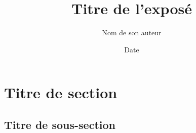 \documentclass{beamer}
\title{Titre de l'exposé}
\author{Nom de son auteur}
\date{Date}
\begin{document}
\frame{\titlepage}

\section{Titre de section}
\frame{\sectionpage}

\subsection{Titre de sous-section}
\frame{\subsectionpage}
\end{document}
